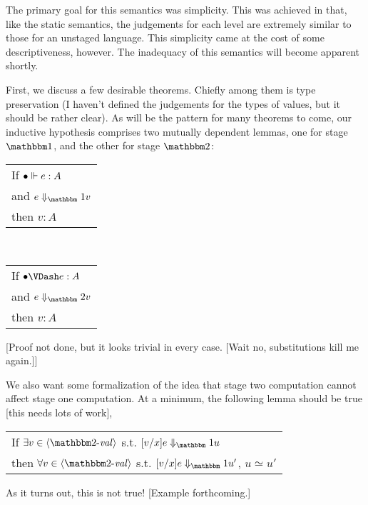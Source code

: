 \documentclass{article}
\begin{document}
The primary goal for this semantics was simplicity.  This was achieved in that, like the static semantics, the judgements for each level are extremely similar to those for an unstaged language.  This simplicity came at the cost of some descriptiveness, however.  The inadequacy of this semantics will become apparent shortly.

First, we discuss a few desirable theorems.  Chiefly among them is type preservation (I haven't defined the judgements for the types of values, but it should be rather clear).  As will be the pattern for many theorems to come, our inductive hypothesis comprises two mutually dependent lemmas, one for stage $\bbone$, and the other for stage $\bbtwo$:
\begin{center}
\begin{tabular}{l}
If $\typesone [\emptyC]{e}{A}$ \\
and $\reduceone{e}{v}$ \\
then $v : A$
\end{tabular}
~~~
\begin{tabular}{l}
If $\typestwo [\emptyC]{e}{A}$ \\
and $\reducetwo{e}{v}$ \\
then $v : A$
\end{tabular}
\end{center}
[Proof not done, but it looks trivial in every case. [Wait no, substitutions kill me again.]]

We also want some formalization of the idea that stage two computation cannot affect stage one computation.  At a minimum, the following lemma should be true [this needs lots of work],

\begin{center}
\begin{tabular}{l}
If $\exists v\in \valt$ s.t. $\reduceone {[v/x]e}{u}$ \\
then $\forall v\in \valt$ s.t. $\reduceone {[v/x]e}{u'}$, $u \simeq u'$
\end{tabular}
\end{center}

As it turns out, this is not true! [Example forthcoming.]
\end{document}
